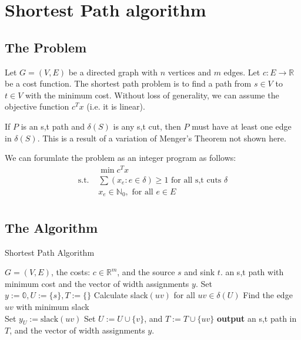 \documentclass[a4paper]{report}
\begin{document}
\section{Shortest Path algorithm}
\subsection{The Problem}
\begin{definition}
  Let $G = (V, E)$ be a directed graph with $n$ vertices and $m$ edges. Let $c : E \rightarrow \mathbb R$ be a cost function. The shortest path problem is to find a path from $s \in V$ to $t \in V$ with the minimum cost. Without loss of generality, we can assume the objective function $c^T x$ (i.e. it is linear).

  \begin{corollary}
    If $P$ is an s,t path and $\delta(S)$ is any s,t cut, then $P$ must have at least one edge in $\delta(S)$. This is a result of a  variation of Menger's Theorem not shown here. 
    \end{corollary}

\end{definition}
We can forumlate the problem as an integer program as follows:
\begin{align*}
  & \min c^T x \\
  \text{s.t. } & \sum (x_e : e \in \delta) \geq 1 \text{ for all s,t cuts } \delta \\
               & x_e \in \mathbb N_{0}, \text{ for all } e \in E \\
\end{align*}

\subsection{The Algorithm}
\begin{algorithm}
  \algrenewcommand{}
  \algrenewcommand{}
    \caption{Shortest Path Algorithm}
  \label{alg:path}
  \begin{algorithmic}[1]
    \Require $G = (V, E)$, the costs: $c \in \mathbb R^m$, and the source $s$ and sink $t$.
    \Ensure an s,t path with minimum cost and the vector of width assignments $y$.
    \State Set $y := \mathbb 0, U := \{s\}, T := \{\}$
      \State Calculate slack$(uv)$ for all $uv \in \delta(U)$ 
      \State Find the edge $uv$ with minimum slack \\ 
      \State Set $y_U := \text{slack}(uv)$
      \State Set $U := U \cup \{v\}$, and $T := T \cup \{uv\}$ 
    \EndWhile {}
    \State \textbf{output} an s,t path in $T$, and the vector of width assignments $y$.
  \end{algorithmic}
\end{algorithm}
\end{document}
